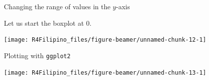 \begin{frame}[fragile]{Changing the range of values in the \(y\)-axis}

Let us start the boxplot at 0.

\begin{Shaded}
\begin{Highlighting}[]
\OperatorTok{~}
         \NormalTok{,}
         \NormalTok{,}
         \NormalTok{,}
         \NormalTok{(}\NormalTok{,}\NormalTok{))}
\end{Highlighting}
\end{Shaded}

\begin{center}\texttt{[image: R4Filipino\_files/figure-beamer/unnamed-chunk-12-1]} \end{center}

\end{frame}

\begin{frame}[fragile]{Plotting with \texttt{ggplot2}}

\begin{Shaded}
\begin{Highlighting}[]
\NormalTok{(}\OperatorTok{+}\StringTok{ }\NormalTok{() }\OperatorTok{+}\StringTok{ }\NormalTok{(}\NormalTok{,}\NormalTok{)}
\end{Highlighting}
\end{Shaded}

\begin{center}\texttt{[image: R4Filipino\_files/figure-beamer/unnamed-chunk-13-1]} \end{center}

\begin{Shaded}
\begin{Highlighting}[]
\NormalTok{(}\OperatorTok{+}\StringTok{ }\NormalTok{() }\OperatorTok{+}\StringTok{ }\NormalTok{(} \NormalTok{(}\NormalTok{,}\NormalTok{)) }
\end{Highlighting}
\end{Shaded}

\end{frame}

